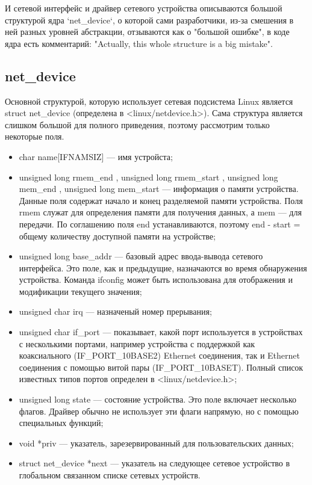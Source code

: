 \documentclass[14pt, a4paper]{extarticle}
\begin{document}
И сетевой интерфейс и драйвер сетевого устройства описываются большой структурой ядра `net\_device`, о которой сами разработчики, из-за смешения в ней разных уровней абстракции, отзываются как о "большой ошибке", в коде ядра есть комментарий: "Actually, this whole structure is a big mistake".



\subsection{net\_device}
Основной структурой, которую использует сетевая подсистема Linux является struct net\_device (определена в <linux/netdevice.h>). Сама структура является слишком большой для полного приведения, поэтому рассмотрим только некоторые поля.
\begin{itemize}
\item char name[IFNAMSIZ] --- имя устройста;

\item unsigned long rmem\_end , unsigned long rmem\_start , unsigned long mem\_end , unsigned long mem\_start --- информация о памяти устройства. Данные поля содержат начало и конец разделяемой памяти устройства. Поля rmem служат для определения памяти для получения данных, а mem --- для передачи. По соглашению поля end устанавливаются, поэтому end - start = общему количеству доступной памяти на устройстве;

\item unsigned long base\_addr --- базовый адрес ввода-вывода сетевого интерфейса. Это поле, как и предыдущие, назначаются во время обнаружения устройства. Команда ifconfig может быть использована для отображения и модификации текущего значения;

\item unsigned char irq --- назначеный номер прерывания;

\item unsigned char if\_port --- показывает, какой порт используется в устройствах с несколькими портами, например устройства с поддержкой как коаксиального (IF\_PORT\_10BASE2) Ethernet соединения, так и Ethernet соединения с помощью витой пары (IF\_PORT\_10BASET). Полный список известных типов портов определен в <linux/netdevice.h>;

\item unsigned long state --- состояние устройства. Это поле включает несколько флагов. Драйвер обычно не использует эти флаги напрямую, но с помощью специальных функций;

\item void *priv --- указатель, зарезервированный для пользовательских данных;

\item struct net\_device *next --- указатель на следующее сетевое устройство в глобальном связанном списке сетевых устройств.

\end{itemize}
\end{document}
